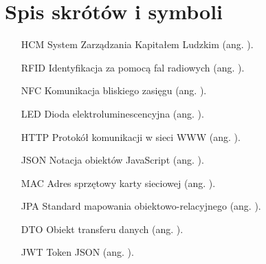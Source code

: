 \chapter{Spis skrótów i symboli}

\begin{itemize}
    \item[HCM] System Zarządzania Kapitałem Ludzkim (ang. ).
    \item[RFID] Identyfikacja za pomocą fal radiowych (ang. ).
    \item[NFC] Komunikacja bliskiego zasięgu (ang. ).
    \item[LED] Dioda elektroluminescencyjna (ang. ).
    \item[HTTP] Protokół komunikacji w sieci WWW (ang. ).
    \item[JSON] Notacja obiektów JavaScript (ang. ).
    \item[MAC] Adres sprzętowy karty sieciowej (ang. ).
    \item[JPA] Standard mapowania obiektowo-relacyjnego (ang. ).
    \item[DTO] Obiekt transferu danych (ang. ).
    \item[JWT] Token JSON (ang. ).
\end{itemize}
